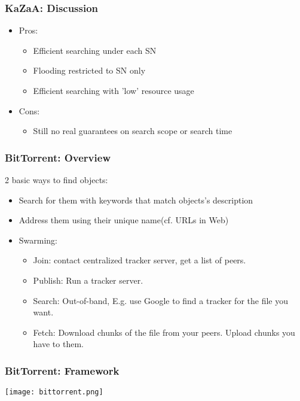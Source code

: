\begin{frame}
    \frametitle{KaZaA: Discussion}
    \begin{itemize}
        \item Pros:
        \begin{itemize}
            \item Efficient searching under each SN
            \item Flooding restricted to SN only
            \item Efficient searching with 'low' resource usage
        \end{itemize}
        \item Cons:
        \begin{itemize}
            \item Still no real guarantees on search scope or search time
        \end{itemize}
    \end{itemize}
\end{frame}

\begin{frame}
    \frametitle{BitTorrent: Overview}
    2 basic ways to find objects: \\
    \begin{itemize}
        \item Search for them with keywords that match objects's description
        \item Address them using their unique name(cf. URLs in Web)
    \end{itemize}
    \begin{itemize}
        \item Swarming:
        \begin{itemize}
            \item Join: contact centralized tracker server, get a list of peers.
            \item Publish: Run a tracker server.
            \item Search: Out-of-band, E.g. use Google to find a tracker for the file you want.
            \item Fetch: Download chunks of the file from your peers. Upload chunks you have to them.
        \end{itemize}
    \end{itemize}
\end{frame}

\begin{frame}
    \frametitle{BitTorrent: Framework}
    \texttt{[image: bittorrent.png]}
\end{frame}

